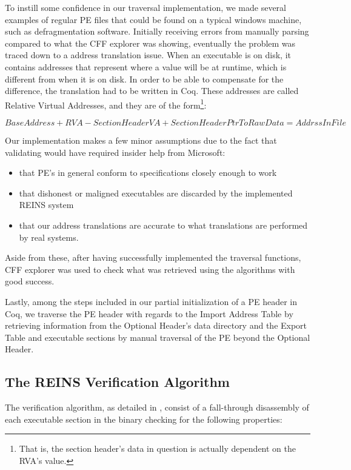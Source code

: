 \documentclass[conference]{IEEEtran}
\begin{document}
To instill some confidence in our traversal implementation, we made several examples of regular PE files that could be found on a typical windows machine, such as defragmentation software. Initially receiving errors from manually parsing compared to what the CFF explorer was showing, eventually the problem was traced down to a address translation issue. When an executable is on disk, it contains addresses that represent where a value will be at runtime, which is different from when it is on disk. In order to be able to compensate for the difference, the translation had to be written in Coq. These addresses are called Relative Virtual Addresses, and they are of the form\footnote{That is, the section header's data in question is actually dependent on the RVA's value.}: 

\begin{math}
Base Address + RVA - SectionHeaderVA + SectionHeaderPtrToRawData = AddrssInFile
\end{math}

Our implementation makes a few minor assumptions due to the fact that validating would have required insider help from Microsoft:
\begin{itemize}
\item that PE's in general conform to specifications closely enough to work
\item that dishonest or maligned executables are discarded by the implemented REINS system
\item that our address translations are accurate to what translations are performed by real systems.
\end {itemize}
Aside from these, after having successfully implemented the traversal functions, CFF explorer was used to check what was retrieved using the algorithms with good success.

Lastly, among the steps included in our partial initialization of a PE header in Coq, we traverse the PE header with regards to the Import Address Table by retrieving information from the Optional Header's data directory and the Export Table and executable sections by manual traversal of the PE beyond the Optional Header.  

\subsection{The REINS Verification Algorithm}

The verification algorithm, as detailed in \cite{wartell12acsac}, consist of a fall-through disassembly of each executable section in the binary checking for the following properties:
\end{document}
